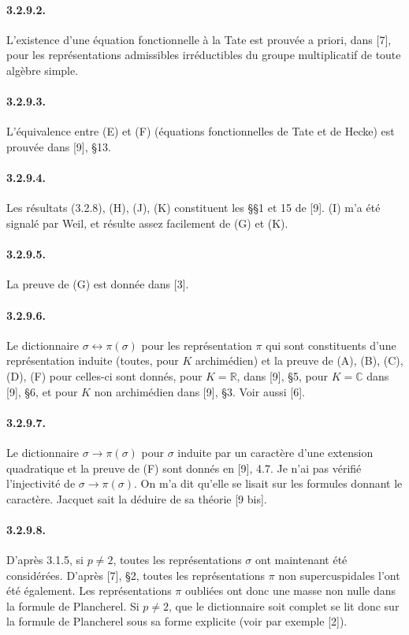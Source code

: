 \documentclass[10pt,a4paper]{article}
\providecommand{\R}{\mathbb R}
\providecommand{\C}{\mathbb C}
\begin{document}
\paragraph{3.2.9.2.} L'existence d'une équation fonctionnelle à la Tate est prouvée a priori, dans [7], pour les représentations admissibles irréductibles du groupe multiplicatif de toute algèbre simple.

\paragraph{3.2.9.3.} L'équivalence entre (E) et (F) (équations fonctionnelles de Tate et de Hecke) est prouvée dans [9], §13.

\paragraph{3.2.9.4.} Les résultats (3.2.8), (H), (J), (K) constituent les §§1 et 15 de [9]. (I) m'a été signalé par Weil, et résulte assez facilement de (G) et (K).

\clearpage
{}
\hypertarget{authority-50}{}
\paragraph{3.2.9.5.} La preuve de (G) est donnée dans [3].

\paragraph{3.2.9.6.} Le dictionnaire \(\sigma\longleftrightarrow\pi(\sigma)\) pour les représentation \(\pi\) qui sont constituents d'une représentation induite (toutes, pour \(K\) archimédien) et la preuve de (A), (B), (C), (D), (F) pour celles-ci sont donnés, pour \(K=\R\), dans [9], §5, pour \(K=\C\) dans [9], §6, et pour \(K\) non archimédien dans [9], §3. Voir aussi [6].

\paragraph{3.2.9.7.} Le dictionnaire \(\sigma\longrightarrow\pi(\sigma)\) pour \(\sigma\) induite par un caractère d'une extension quadratique et la preuve de (F) sont donnés en [9], 4.7. Je n'ai pas vérifié l'injectivité de \(\sigma\longrightarrow\pi(\sigma)\). On m'a dit qu'elle se lisait sur les formules donnant le caractère. Jacquet sait la déduire de sa théorie [9 bis].

\paragraph{3.2.9.8.} D'après 3.1.5, si \(p\ne2\), toutes les représentations \(\sigma\) ont maintenant été considérées. D'après [7], §2, toutes les représentations \(\pi\) non supercuspidales l'ont été également. Les représentations \(\pi\) oubliées ont donc une masse non nulle dans la formule de Plancherel. Si \(p\ne2\), que le dictionnaire soit complet se lit donc sur la formule de Plancherel sous sa forme explicite (voir par exemple [2]).
\end{document}
